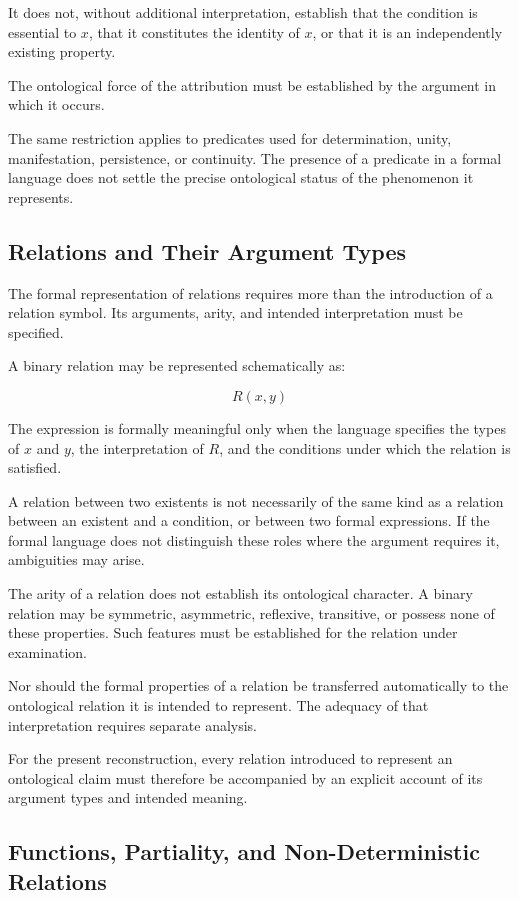 It does not, without
additional interpretation,
establish that the
condition is essential
to \(x\), that it
constitutes the identity
of \(x\), or that it
is an independently
existing property.

The ontological force
of the attribution
must be established
by the argument in
which it occurs.

The same restriction
applies to predicates
used for determination,
unity, manifestation,
persistence, or continuity.
The presence of a
predicate in a formal
language does not
settle the precise
ontological status
of the phenomenon
it represents.

\subsection{Relations and Their Argument Types}

The formal representation
of relations requires
more than the introduction
of a relation symbol.
Its arguments, arity,
and intended interpretation
must be specified.

A binary relation
may be represented
schematically as:

\[
R(x,y)
\]

The expression is
formally meaningful
only when the language
specifies the types
of \(x\) and \(y\),
the interpretation
of \(R\), and the
conditions under
which the relation
is satisfied.

A relation between
two existents is
not necessarily of
the same kind as
a relation between
an existent and
a condition, or
between two formal
expressions. If the
formal language does
not distinguish these
roles where the
argument requires
it, ambiguities
may arise.

The arity of a
relation does not
establish its ontological
character. A binary
relation may be
symmetric, asymmetric,
reflexive, transitive,
or possess none
of these properties.
Such features must
be established
for the relation
under examination.

Nor should the
formal properties
of a relation
be transferred
automatically to
the ontological
relation it is
intended to represent.
The adequacy of
that interpretation
requires separate
analysis.

For the present
reconstruction, every
relation introduced
to represent an
ontological claim
must therefore be
accompanied by
an explicit account
of its argument
types and intended
meaning.

\subsection{Functions, Partiality, and Non-Deterministic Relations}

